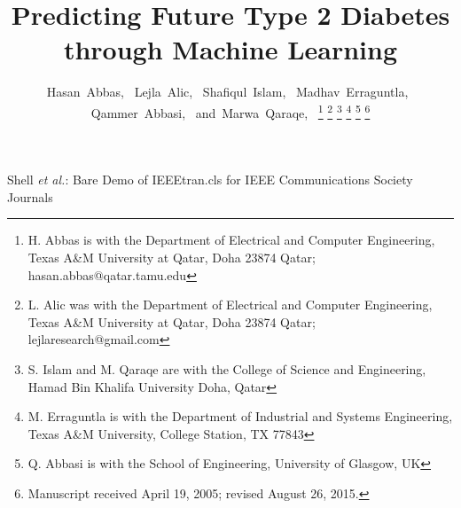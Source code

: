 \documentclass[journal,comsoc]{IEEEtran}
\begin{document}
%
\title{Predicting Future Type 2 Diabetes through Machine Learning}
%
%

\author{Hasan~Abbas,~
        Lejla~Alic,~
        Shafiqul~Islam,~
        Madhav~Erraguntla,~
        Qammer~Abbasi,~
        and~Marwa~Qaraqe,~%
\thanks{H. Abbas is with the Department
of Electrical and Computer Engineering, Texas A\&M University at Qatar, Doha 23874 Qatar;  hasan.abbas@qatar.tamu.edu}%
\thanks{L. Alic was with the Department
of Electrical and Computer Engineering, Texas A\&M University at Qatar, Doha 23874 Qatar; lejlaresearch@gmail.com}%
\thanks{S. Islam and M. Qaraqe are with the College of Science and Engineering, Hamad Bin Khalifa University Doha, Qatar}%
\thanks{M. Erraguntla is with the Department of Industrial and Systems Engineering, Texas A\&M University, College Station, TX 77843}%
\thanks{Q. Abbasi is with the School of Engineering, University of Glasgow, UK}%
\thanks{Manuscript received April 19, 2005; revised August 26, 2015.}}

%
%



%
{Shell \MakeLowercase{\textit{et al.}}: Bare Demo of IEEEtran.cls for IEEE Communications Society Journals}
%
\end{document}
